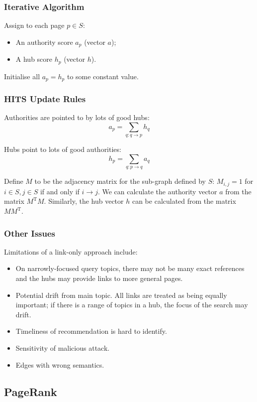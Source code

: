 \documentclass[a4paper,11pt]{article}
\begin{document}
\subsubsection{Iterative Algorithm}
Assign to each page $p \in S$:
\begin{itemize}
    \item   An authority score $a_p$ (vector $a$);
    \item   A hub score $h_p$ (vector $h$).
\end{itemize}

Initialise all $a_p = h_p$ to some constant value.

\subsubsection{HITS Update Rules}
Authorities are pointed to by lots of good hubs:
\[
    a_p = \sum_{q: q \rightarrow p } h_q
\]

Hubs point to lots of good authorities:
\[
    h_p = \sum_{q: p \rightarrow q} a_q
\]

Define $M$ to be the adjacency matrix for the sub-graph defined by $S$: $M_{i,j} = 1$ for $i \in S, j \in S$ if and only if $i \rightarrow j$.
We can calculate the authority vector $a$ from the matrix $M^{\text{T}}M$.
Similarly, the hub vector $h$ can be calculated from the matrix $MM^{\text{T}}$.

\subsubsection{Other Issues}
Limitations of a link-only approach include:
\begin{itemize}
    \item   On narrowly-focused query topics, there may not be many exact references and the hubs may provide links to more general pages.
    \item   Potential drift from main topic.
            All links are treated as being equally important; if there is a range of topics in a hub, the focus of the search may drift.
    \item   Timeliness of recommendation is hard to identify.
    \item   Sensitivity of malicious attack.
    \item   Edges with wrong semantics.
\end{itemize}

\subsection{PageRank}
\end{document}
